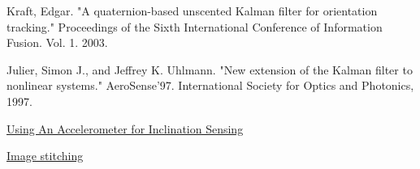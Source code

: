 \documentclass[fleqn,10pt]{SelfArx} %
\begin{document}
\begin{thebibliography}{9}
Kraft, Edgar. "A quaternion-based unscented Kalman filter for orientation tracking." Proceedings of the Sixth International Conference of Information Fusion. Vol. 1. 2003.

Julier, Simon J., and Jeffrey K. Uhlmann. "New extension of the Kalman filter to nonlinear systems." AeroSense'97. International Society for Optics and Photonics, 1997.

\hyperref[http://www.digikey.com/en/articles/techzone/2011/may/using-an-accelerometer-for-inclination-sensing] {Using An Accelerometer for Inclination Sensing}

\hyperref[http://www.csie.ntu.edu.tw/cyy/courses/vfx/05spring/lectures/handouts/lec06_stitching_4up.pdf]{Image stitching}
\end{thebibliography}

%
%

\end{document}
